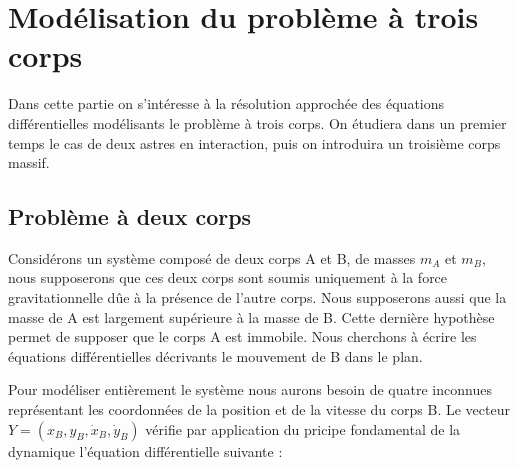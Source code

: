 \section{Modélisation du problème à trois corps}
Dans cette partie on s'intéresse à la résolution approchée des équations différentielles modélisants le problème à trois corps. On étudiera dans un premier temps le cas de deux astres en interaction, puis on introduira un troisième corps massif.
\subsection{Problème à deux corps}
Considérons un système composé de deux corps A et B, de masses $m_{A}$ et $m_{B}$, nous supposerons que ces deux corps sont soumis uniquement à la force gravitationnelle dûe à la présence de l'autre corps. Nous supposerons aussi que la masse de A est largement supérieure à la masse de B. Cette dernière hypothèse permet de supposer que le corps A est immobile. Nous cherchons à écrire les équations différentielles décrivants le mouvement de B dans le plan.

Pour modéliser entièrement le système nous aurons besoin de quatre inconnues représentant les coordonnées de la position et de la vitesse du corps B. Le vecteur $Y = (x_{B},y_{B},\dot x_{B},\dot y_{B})$ vérifie par application du pricipe fondamental de la dynamique l'équation différentielle suivante :

